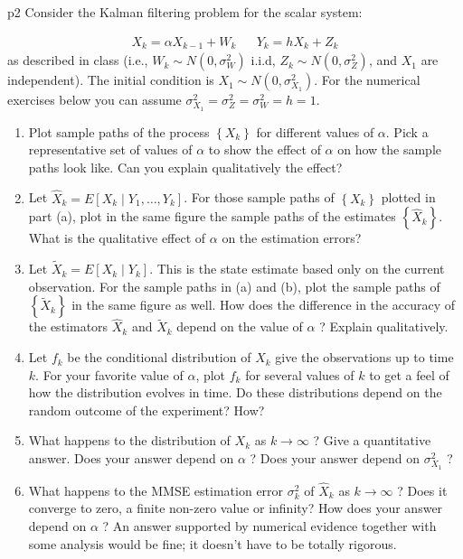 \documentclass[a4paper, 11pt]{article}
\begin{document}
\begin{problem}{%
    }{p2%
    }
Consider the Kalman filtering problem for the scalar system:

\begin{align*}
	X_k  =\alpha X_{k-1}+W_k && 	Y_k =h X_k+Z_k
\end{align*}
as described in class (i.e., $W_k \sim N\left(0, \sigma_W^2\right)$ i.i.d, $Z_k \sim N\left(0, \sigma_Z^2\right)$, and $X_1$ are independent). The initial condition is $X_1 \sim N\left(0, \sigma_{X_1}^2\right)$. For the numerical exercises below you can assume $\sigma_{X_1}^2=\sigma_Z^2=\sigma_W^2=h=1$.\begin{enumerate}[label=(\alph*)]
	\item Plot sample paths of the process $\left\{X_k\right\}$ for different values of $\alpha$. Pick a representative set of values of $\alpha$ to show the effect of $\alpha$ on how the sample paths look like. Can you explain qualitatively the effect?
\item Let $\hat{X}_k=E\left[X_k \mid Y_1, \ldots, Y_k\right]$. For those sample paths of $\left\{X_k\right\}$ plotted in part (a), plot in the same figure the sample paths of the estimates $\left\{\hat{X}_k\right\}$. What is the qualitative effect of $\alpha$ on the estimation errors?
\item Let $\tilde{X}_k=E\left[X_k \mid Y_k\right]$. This is the state estimate based only on the current observation. For the sample paths in (a) and (b), plot the sample paths of $\left\{\tilde{X}_k\right\}$ in the same figure as well. How does the difference in the accuracy of the estimators $\hat{X}_k$ and $\tilde{X}_k$ depend on the value of $\alpha$ ? Explain qualitatively.
\item Let $f_k$ be the conditional distribution of $X_k$ give the observations up to time $k$. For your favorite value of $\alpha$, plot $f_k$ for several values of $k$ to get a feel of how the distribution evolves in time. Do these distributions depend on the random outcome of the experiment? How?
\item What happens to the distribution of $X_k$ as $k \rightarrow \infty$ ? Give a quantitative answer. Does your answer depend on $\alpha$ ? Does your answer depend on $\sigma_{X_1}^2$ ?
\item What happens to the MMSE estimation error $\sigma_k^2$ of $\hat{X}_k$ as $k \rightarrow \infty$ ? Does it converge to zero, a finite non-zero value or infinity? How does your answer depend on $\alpha$ ? An answer supported by numerical evidence together with some analysis would be fine; it doesn't have to be totally rigorous.
\end{enumerate}
\end{problem}
\end{document}
